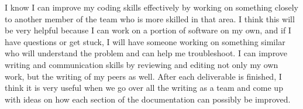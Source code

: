 \documentclass[12pt]{article}
\begin{document}
\begin{enumerate}
\begin{enumerate}
    I know I can improve my coding skills effectively by working on something closely to another member of the team who is more skilled in that area. I think this will be very helpful because I can work on a portion of software on my own, and if I have questions or get stuck, I will have someone working on something similar who will understand the problem and can help me troubleshoot. 
    \noindent I can improve writing and communication skills by reviewing and editing not only my own work, but the writing of my peers as well. After each deliverable is finished, I think it is very useful when we go over all the writing as a team and come up with ideas on how each section of the documentation can possibly be improved. 
  \end{enumerate}
\end{enumerate}
\end{document}
